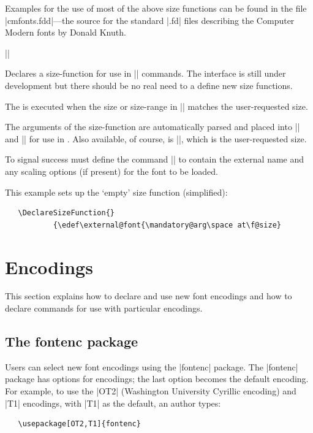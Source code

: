 \documentclass{ltxguide}[1995/11/28]
\begin{document}
Examples for the use of most of the above size functions can be found in
the file |cmfonts.fdd|---the source for the standard |.fd| files
describing the Computer Modern fonts by Donald Knuth.


\begin{decl}
  |\DeclareSizeFunction|  
\end{decl}

Declares a size-function  for use in |\DeclareFontShape|
commands.  The interface is still under development but there should be
no real need to a define new size functions.

The  is executed when the size or size-range in
|\DeclareFontShape| matches the user-requested size.

The arguments of the size-function are automatically parsed and placed
into |\mandatory@arg| and |\optional@arg| for use in . Also
available, of course, is |\f@size|, which is the user-requested size.

To signal success  must define the command |\external@font| to
contain the external name and any scaling options (if present) for the
font to be loaded.

This example sets up the `empty' size function (simplified):
\begin{verbatim}
   \DeclareSizeFunction{}
           {\edef\external@font{\mandatory@arg\space at\f@size}
\end{verbatim}


\section{Encodings}
\label{sec:encode}

This section explains how to declare and use new font encodings and how
to declare commands for use with particular encodings.

\subsection{The \textsf{fontenc} package}

Users can select new font encodings using the |fontenc| package.  The
|fontenc| package has options for encodings; the last option becomes the
default encoding.  For example, to use the |OT2| (Washington University
Cyrillic encoding) and |T1| encodings, with |T1| as the default, an
author types:
\begin{verbatim}
   \usepackage[OT2,T1]{fontenc}
\end{verbatim}
\end{document}
